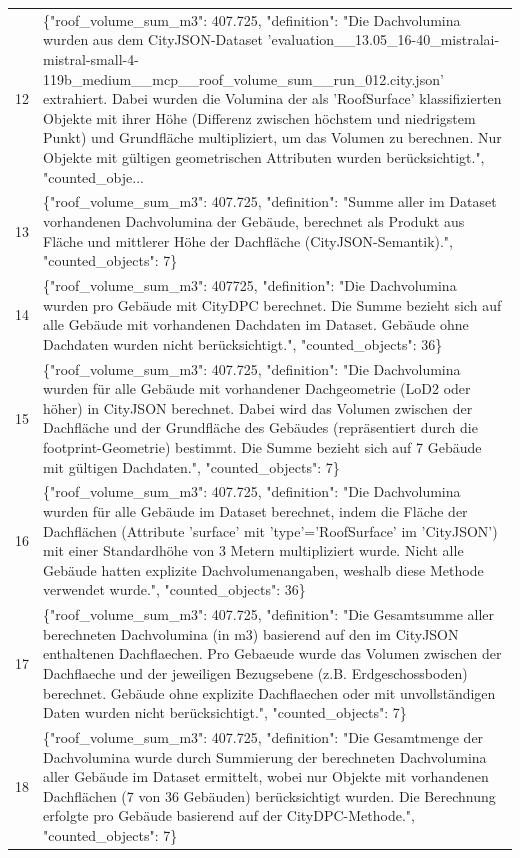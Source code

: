 \documentclass[a4paper,11pt]{article}
\begin{document}
\begin{table}[ht]
\begin{tabular}{r p{12cm}}
12 & \{"roof\_volume\_sum\_m3": 407.725, "definition": "Die Dachvolumina wurden aus dem CityJSON-Dataset 'evaluation\_\_13.05\_16-40\_mistralai-mistral-small-4-119b\_medium\_\_mcp\_\_roof\_volume\_sum\_\_run\_012.city.json' extrahiert. Dabei wurden die Volumina der als 'RoofSurface' klassifizierten Objekte mit ihrer Höhe (Differenz zwischen höchstem und niedrigstem Punkt) und Grundfläche multipliziert, um das Volumen zu berechnen. Nur Objekte mit gültigen geometrischen Attributen wurden berücksichtigt.", "counted\_obje... \\
13 & \{"roof\_volume\_sum\_m3": 407.725, "definition": "Summe aller im Dataset vorhandenen Dachvolumina der Gebäude, berechnet als Produkt aus Fläche und mittlerer Höhe der Dachfläche (CityJSON-Semantik).", "counted\_objects": 7\} \\
14 & \{"roof\_volume\_sum\_m3": 407725, "definition": "Die Dachvolumina wurden pro Gebäude mit CityDPC berechnet. Die Summe bezieht sich auf alle Gebäude mit vorhandenen Dachdaten im Dataset. Gebäude ohne Dachdaten wurden nicht berücksichtigt.", "counted\_objects": 36\} \\
15 & \{"roof\_volume\_sum\_m3": 407.725, "definition": "Die Dachvolumina wurden für alle Gebäude mit vorhandener Dachgeometrie (LoD2 oder höher) in CityJSON berechnet. Dabei wird das Volumen zwischen der Dachfläche und der Grundfläche des Gebäudes (repräsentiert durch die footprint-Geometrie) bestimmt. Die Summe bezieht sich auf 7 Gebäude mit gültigen Dachdaten.", "counted\_objects": 7\} \\
16 & \{"roof\_volume\_sum\_m3": 407.725, "definition": "Die Dachvolumina wurden für alle Gebäude im Dataset berechnet, indem die Fläche der Dachflächen (Attribute 'surface' mit 'type'='RoofSurface' im 'CityJSON') mit einer Standardhöhe von 3 Metern multipliziert wurde. Nicht alle Gebäude hatten explizite Dachvolumenangaben, weshalb diese Methode verwendet wurde.", "counted\_objects": 36\} \\
17 & \{"roof\_volume\_sum\_m3": 407.725, "definition": "Die Gesamtsumme aller berechneten Dachvolumina (in m3) basierend auf den im CityJSON enthaltenen Dachflaechen. Pro Gebaeude wurde das Volumen zwischen der Dachflaeche und der jeweiligen Bezugsebene (z.B. Erdgeschossboden) berechnet. Gebäude ohne explizite Dachflaechen oder mit unvollständigen Daten wurden nicht berücksichtigt.", "counted\_objects": 7\} \\
18 & \{"roof\_volume\_sum\_m3": 407.725, "definition": "Die Gesamtmenge der Dachvolumina wurde durch Summierung der berechneten Dachvolumina aller Gebäude im Dataset ermittelt, wobei nur Objekte mit vorhandenen Dachflächen (7 von 36 Gebäuden) berücksichtigt wurden. Die Berechnung erfolgte pro Gebäude basierend auf der CityDPC-Methode.", "counted\_objects": 7\} \\

\end{tabular}
\end{table}
\end{document}
